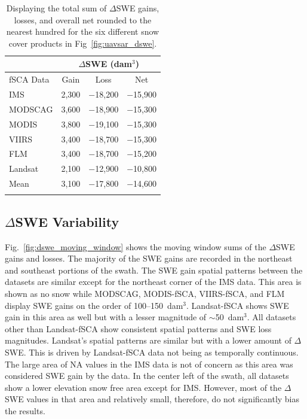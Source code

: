 \begin{table}
\centering
\caption{Displaying the total sum of $\Delta$SWE gains, losses, and overall net rounded to the nearest hundred for the six different snow cover products in Fig~\ref{fig:uavsar_dswe}.}
\begin{tabular}{lccc}
\toprule
& \multicolumn{3}{c}{$\Delta$SWE (dam$^{3}$)} \\
\midrule
fSCA Data & Gain & Loss & Net \\
\midrule
IMS & 2,300 & $-$18,200 & $-$15,900 \\
MODSCAG & 3,600 & $-$18,900 & $-$15,300 \\
MODIS & 3,800 & $-$19,100 & $-$15,300 \\
VIIRS & 3,400 & $-$18,700 & $-$15,300 \\
FLM & 3,400 & $-$18,700 & $-$15,200 \\
Landsat & 2,100 & $-$12,900 & $-$10,800 \\
\midrule
Mean & 3,100 & $-$17,800 & $-$14,600 \\
\bottomrule
\label{tab:dswe_stats}
\end{tabular}
\end{table}



\hypertarget{ch4-results}{\subsection{$\Delta$SWE Variability}\label{ch4-results}}

Fig.~\ref{fig:dswe_moving_window} shows the moving window sums of the $\Delta$SWE gains and losses. The majority of the SWE gains are recorded in the northeast and southeast portions of the swath. The SWE gain spatial patterns between the datasets are similar except for the northeast corner of the IMS data. This area is shown as no snow while MODSCAG, MODIS-fSCA, VIIRS-fSCA, and FLM display SWE gains on the order of 100--150~dam$^{3}$. Landsat-fSCA shows SWE gain in this area as well but with a lesser magnitude of $\sim$50~dam$^{3}$. All datasets other than Landsat-fSCA show consistent spatial patterns and SWE loss magnitudes. Landsat's spatial patterns are similar but with a lower amount of $\Delta$SWE. This is driven by Landsat-fSCA data not being as temporally continuous. The large area of NA values in the IMS data is not of concern as this area was considered SWE gain by the data. In the center left of the swath, all datasets show a lower elevation snow free area except for IMS. However, most of the $\Delta$SWE values in that area and relatively small, therefore, do not significantly bias the results.

